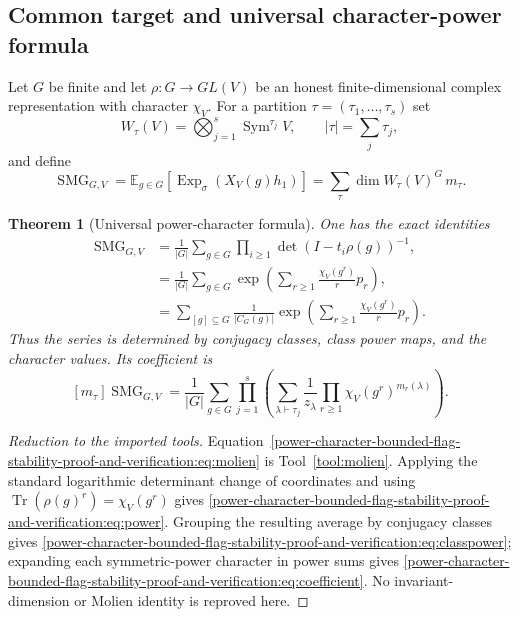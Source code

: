 \documentclass[10pt]{article}
\newcommand{\Sym}{\operatorname{Sym}}
\newcommand{\Tr}{\operatorname{Tr}}
\newcommand{\ExpS}{\operatorname{Exp}_{\sigma}}
\newcommand{\SMG}{\operatorname{SMG}}
\newcommand{\MGF}{\SMG}
\newcommand{\E}{\mathbb E}
\newtheorem{theorem}{Theorem}
\begin{document}
\subsection{Common target and universal character-power formula}

Let $G$ be finite and let $\rho:G\to GL(V)$ be an honest finite-dimensional
complex representation with character $\chi_V$.  For a partition
$\tau=(\tau_1,\ldots,\tau_s)$ set
\[
 W_\tau(V)=\bigotimes_{j=1}^s\Sym^{\tau_j}V,
 \qquad |\tau|=\sum_j\tau_j,
\]
and define
\[
 \MGF_{G,V}=\E_{g\in G}\!\left[\ExpS(X_V(g)h_1)\right]
 =\sum_\tau\dim W_\tau(V)^G\,m_\tau.
\]

\begin{theorem}[Universal power-character formula]\label{power-character-bounded-flag-stability-proof-and-verification:thm:power}
One has the exact identities
\begin{align}
\MGF_{G,V}
 &=\frac1{|G|}\sum_{g\in G}\prod_{i\ge1}
       \det(I-t_i\rho(g))^{-1},\label{power-character-bounded-flag-stability-proof-and-verification:eq:molien}\\
 &=\frac1{|G|}\sum_{g\in G}\exp\!\left(
       \sum_{r\ge1}\frac{\chi_V(g^r)}r p_r\right),\label{power-character-bounded-flag-stability-proof-and-verification:eq:power}\\
 &=\sum_{[g]\subseteq G}\frac1{|C_G(g)|}\exp\!\left(
       \sum_{r\ge1}\frac{\chi_V(g^r)}r p_r\right).\label{power-character-bounded-flag-stability-proof-and-verification:eq:classpower}
\end{align}
Thus the series is determined by conjugacy classes, class power maps, and the
character values.  Its coefficient is
\begin{equation}\label{power-character-bounded-flag-stability-proof-and-verification:eq:coefficient}
[m_\tau]\MGF_{G,V}=\frac1{|G|}\sum_{g\in G}\prod_{j=1}^s
\left(\sum_{\lambda\vdash\tau_j}\frac1{z_\lambda}
\prod_{r\ge1}\chi_V(g^r)^{m_r(\lambda)}\right).
\end{equation}
\end{theorem}

\begin{proof}[Reduction to the imported tools]
Equation~\eqref{power-character-bounded-flag-stability-proof-and-verification:eq:molien}
is Tool~\ref{tool:molien}.  Applying the standard logarithmic determinant
change of coordinates and using
$\Tr(\rho(g)^r)=\chi_V(g^r)$ gives
\eqref{power-character-bounded-flag-stability-proof-and-verification:eq:power}.
Grouping the resulting average by conjugacy classes gives
\eqref{power-character-bounded-flag-stability-proof-and-verification:eq:classpower}; expanding each symmetric-power character in power sums gives
\eqref{power-character-bounded-flag-stability-proof-and-verification:eq:coefficient}.
No invariant-dimension or Molien identity is reproved here.
\end{proof}
\end{document}
